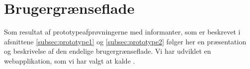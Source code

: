 \section{Brugergrænseflade}
\label{sec:webapplikationen}

Som resultat af prototypeafprøvningerne med informanter, som er beskrevet i afsnittene \ref{subsec:prototype1} og \ref{subsec:prototype2} følger her en præsentation og beskrivelse af den endelige brugergrænseflade. Vi har udviklet en webapplikation, som vi har valgt at kalde \Foodl{}.







